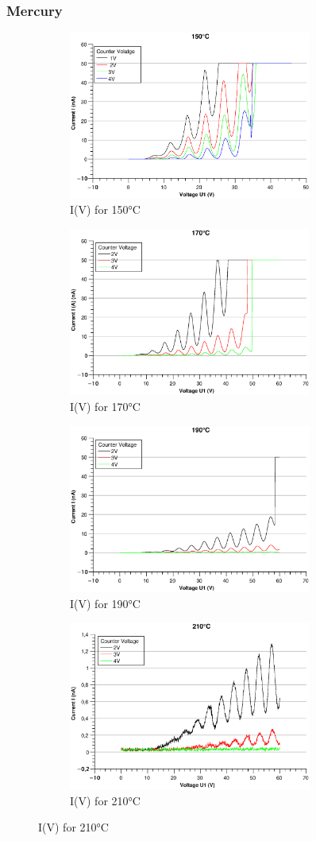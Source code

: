 \documentclass{scrartcl}
\begin{document}
\subsubsection{Mercury}
\begin{figure}[h]
\begin{center}
\begin{subfigure}{0.49 \textwidth}
\includegraphics[width=8cm]{150.eps}
\caption{I(V) for 150°C}
\end{subfigure}
\begin{subfigure}{0.49 \textwidth}
\includegraphics[width=8cm]{170.eps}
\caption{I(V) for 170°C}
\end{subfigure}
\begin{subfigure}{0.49 \textwidth}
\includegraphics[width=8cm]{190.eps}
\caption{I(V) for 190°C}
\end{subfigure}
\begin{subfigure}{0.49 \textwidth}
\includegraphics[width=8cm]{210.eps}
\caption{I(V) for 210°C}
\end{subfigure}
\end{center}
\end{figure}
\end{document}
